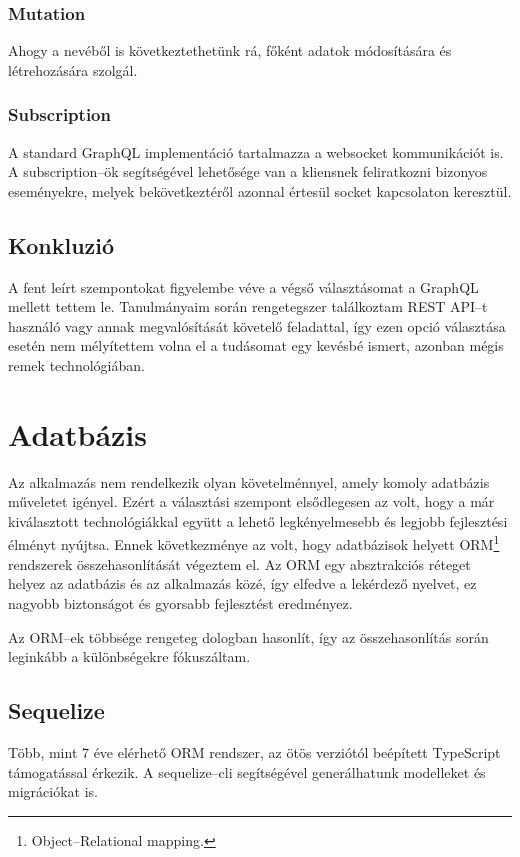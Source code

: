 \subsubsection{Mutation}
Ahogy a nevéből is következtethetünk rá, főként adatok módosítására és létrehozására szolgál.
  

\subsubsection{Subscription}
A standard GraphQL implementáció tartalmazza a websocket kommunikációt is. A subscription–ök segítségével lehetősége van a kliensnek feliratkozni bizonyos eseményekre, melyek bekövetkeztéről azonnal értesül socket kapcsolaton keresztül.

\subsection{Konkluzió}
A fent leírt szempontokat figyelembe véve a végső választásomat a GraphQL mellett tettem le.
Tanulmányaim során rengetegszer találkoztam REST API–t használó vagy annak megvalósítását követelő feladattal, így ezen opció választása esetén nem mélyítettem volna el a tudásomat egy kevésbé ismert, azonban mégis remek technológiában.

\section{Adatbázis}
Az alkalmazás nem rendelkezik olyan követelménnyel, amely komoly adatbázis műveletet igényel.
Ezért a választási szempont elsődlegesen az volt, hogy a már kiválasztott technológiákkal együtt a lehető legkényelmesebb és legjobb fejlesztési élményt nyújtsa. Ennek következménye az volt, hogy adatbázisok helyett ORM\footnote{Object–Relational mapping.} rendszerek összehasonlítását végeztem el.
Az ORM egy absztrakciós réteget helyez az adatbázis és az alkalmazás közé, így elfedve a lekérdező nyelvet, ez nagyobb biztonságot és gyorsabb fejlesztést eredményez.

Az ORM–ek többsége rengeteg dologban hasonlít, így az összehasonlítás során leginkább a különbségekre fókuszáltam.

\subsection{Sequelize}
Több, mint 7 éve elérhető ORM rendszer, az ötös verziótól beépített TypeScript támogatással érkezik.
A sequelize–cli segítségével generálhatunk modelleket és migrációkat is.\cite{Sequelize}

